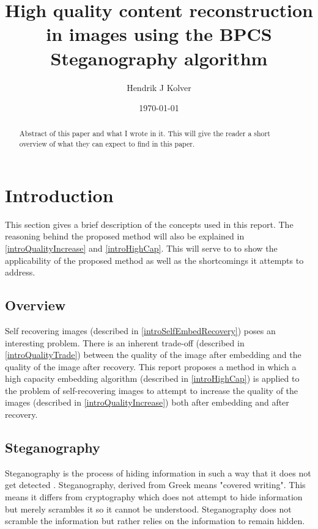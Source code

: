 \documentclass[12pt]{article}
\title{High quality content reconstruction in images using the BPCS Steganography algorithm}
\author{Hendrik J Kolver}
\date{\today}
\begin{document}
\maketitle

\begin{abstract}

\noindent Abstract of this paper and what I wrote in it.
This will give the reader a short overview of what they can expect to find in this paper.

\end{abstract}

\section{Introduction}


This section gives a brief description of the concepts used in this report.
The reasoning behind the proposed method will also be explained in \ref{introQualityIncrease} and \ref{introHighCap}.
This will serve to to show the applicability of the proposed method as well as the shortcomings it attempts to address. 

\subsection{Overview}
Self recovering images (described in \ref{introSelfEmbedRecovery}) poses an interesting problem.
There is an inherent trade-off (described in \ref{introQualityTrade}) between the quality of the image after embedding and the quality of the image after recovery.
This report proposes a method in which a high capacity embedding algorithm (described in \ref{introHighCap}) is applied to the problem of self-recovering images to attempt to increase the quality of the images (described in \ref{introQualityIncrease}) both after embedding and after recovery.


\subsection{Steganography}
\label{introSteganography}
Steganography is the process of hiding information in such a way that it does not get detected \cite{johnson1998exploring}.
Steganography, derived from Greek means "covered writing".
This means it differs from cryptography which does not attempt to hide information but merely scrambles it so it cannot be understood.
Steganography does not scramble the information but rather relies on the information to remain hidden. 
\end{document}
